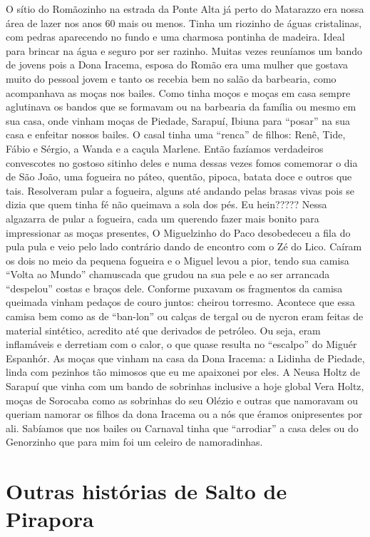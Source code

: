 \documentclass[12pt,brazil,]{book}
\begin{document}
O sítio do Romãozinho na estrada da Ponte Alta já perto do Matarazzo era
nossa área de lazer nos anos 60 mais ou menos. Tinha um riozinho de
águas cristalinas, com pedras aparecendo no fundo e uma charmosa
pontinha de madeira. Ideal para brincar na água e seguro por ser
razinho. Muitas vezes reuníamos um bando de jovens pois a Dona Iracema,
esposa do Romão era uma mulher que gostava muito do pessoal jovem e
tanto os recebia bem no salão da barbearia, como acompanhava as moças
nos bailes. Como tinha moços e moças em casa sempre aglutinava os bandos
que se formavam ou na barbearia da família ou mesmo em sua casa, onde
vinham moças de Piedade, Sarapuí, Ibiuna para ``posar'' na sua casa e
enfeitar nossos bailes. O casal tinha uma ``renca'' de filhos: Renê,
Tide, Fábio e Sérgio, a Wanda e a caçula Marlene. Então fazíamos
verdadeiros convescotes no gostoso sitinho deles e numa dessas vezes
fomos comemorar o dia de São João, uma fogueira no páteo, quentão,
pipoca, batata doce e outros que tais. Resolveram pular a fogueira,
alguns até andando pelas brasas vivas pois se dizia que quem tinha fé
não queimava a sola dos pés. Eu hein????? Nessa algazarra de pular a
fogueira, cada um querendo fazer mais bonito para impressionar as moças
presentes, O Miguelzinho do Paco desobedeceu a fila do pula pula e veio
pelo lado contrário dando de encontro com o Zé do Lico. Caíram os dois
no meio da pequena fogueira e o Miguel levou a pior, tendo sua camisa
``Volta ao Mundo'' chamuscada que grudou na sua pele e ao ser arrancada
``despelou'' costas e braços dele. Conforme puxavam os fragmentos da
camisa queimada vinham pedaços de couro juntos: cheirou torresmo.
Acontece que essa camisa bem como as de ``ban-lon'' ou calças de tergal
ou de nycron eram feitas de material sintético, acredito até que
derivados de petróleo. Ou seja, eram inflamáveis e derretiam com o
calor, o que quase resulta no ``escalpo'' do Miguér Espanhór. As moças
que vinham na casa da Dona Iracema: a Lidinha de Piedade, linda com
pezinhos tão mimosos que eu me apaixonei por eles. A Neusa Holtz de
Sarapuí que vinha com um bando de sobrinhas inclusive a hoje global Vera
Holtz, moças de Sorocaba como as sobrinhas do seu Olézio e outras que
namoravam ou queriam namorar os filhos da dona Iracema ou a nós que
éramos onipresentes por ali. Sabíamos que nos bailes ou Carnaval tinha
que ``arrodiar'' a casa deles ou do Genorzinho que para mim foi um
celeiro de namoradinhas.

\section{Outras histórias de Salto de
Pirapora}\label{outras-histuxf3rias-de-salto-de-pirapora}
\end{document}
